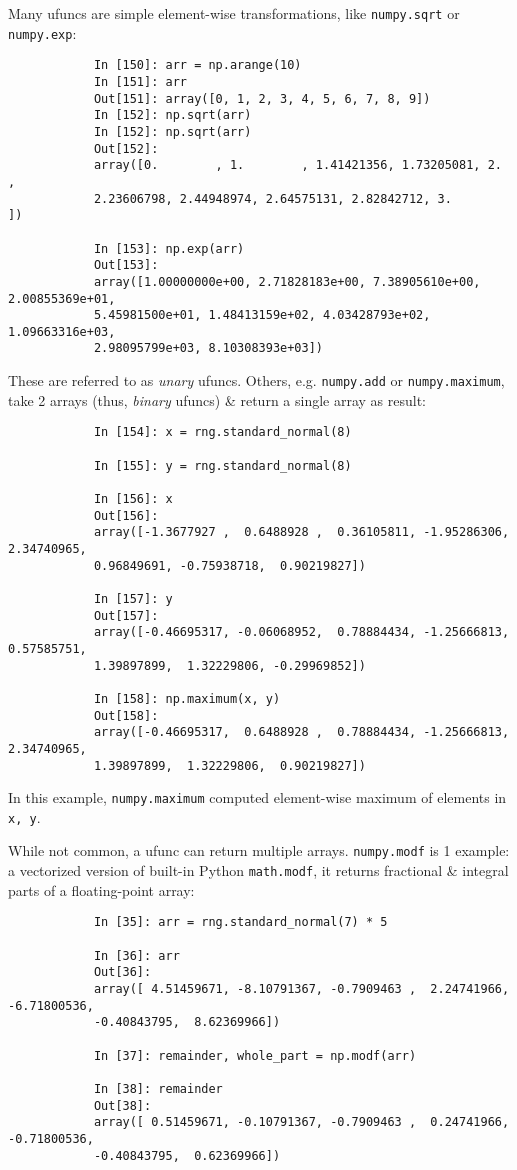 \documentclass{article}
\begin{document}
\begin{itemize}
\begin{itemize}
		Many ufuncs are simple element-wise transformations, like {\tt numpy.sqrt} or {\tt numpy.exp}:
		\begin{verbatim}
			In [150]: arr = np.arange(10)
			In [151]: arr
			Out[151]: array([0, 1, 2, 3, 4, 5, 6, 7, 8, 9])
			In [152]: np.sqrt(arr)
			In [152]: np.sqrt(arr)
			Out[152]: 
			array([0.        , 1.        , 1.41421356, 1.73205081, 2.        ,
			2.23606798, 2.44948974, 2.64575131, 2.82842712, 3.        ])
			
			In [153]: np.exp(arr)
			Out[153]: 
			array([1.00000000e+00, 2.71828183e+00, 7.38905610e+00, 2.00855369e+01,
			5.45981500e+01, 1.48413159e+02, 4.03428793e+02, 1.09663316e+03,
			2.98095799e+03, 8.10308393e+03])
		\end{verbatim}
		These are referred to as {\it unary} ufuncs. Others, e.g. {\tt numpy.add} or {\tt numpy.maximum}, take 2 arrays (thus, {\it binary} ufuncs) \& return a single array as result:
		\begin{verbatim}
			In [154]: x = rng.standard_normal(8)
			
			In [155]: y = rng.standard_normal(8)
			
			In [156]: x
			Out[156]: 
			array([-1.3677927 ,  0.6488928 ,  0.36105811, -1.95286306,  2.34740965,
			0.96849691, -0.75938718,  0.90219827])
			
			In [157]: y
			Out[157]: 
			array([-0.46695317, -0.06068952,  0.78884434, -1.25666813,  0.57585751,
			1.39897899,  1.32229806, -0.29969852])
			
			In [158]: np.maximum(x, y)
			Out[158]: 
			array([-0.46695317,  0.6488928 ,  0.78884434, -1.25666813,  2.34740965,
			1.39897899,  1.32229806,  0.90219827])
		\end{verbatim}
		In this example, {\tt numpy.maximum} computed element-wise maximum of elements in {\tt x, y}.
		
		While not common, a ufunc can return multiple arrays. {\tt numpy.modf} is 1 example: a vectorized version of built-in Python {\tt math.modf}, it returns fractional \& integral parts of a floating-point array:
		\begin{verbatim}
			In [35]: arr = rng.standard_normal(7) * 5
			
			In [36]: arr
			Out[36]: 
			array([ 4.51459671, -8.10791367, -0.7909463 ,  2.24741966, -6.71800536,
			-0.40843795,  8.62369966])
			
			In [37]: remainder, whole_part = np.modf(arr)
			
			In [38]: remainder
			Out[38]: 
			array([ 0.51459671, -0.10791367, -0.7909463 ,  0.24741966, -0.71800536,
			-0.40843795,  0.62369966])
			

\end{verbatim}
\end{itemize}
\end{itemize}
\end{document}

